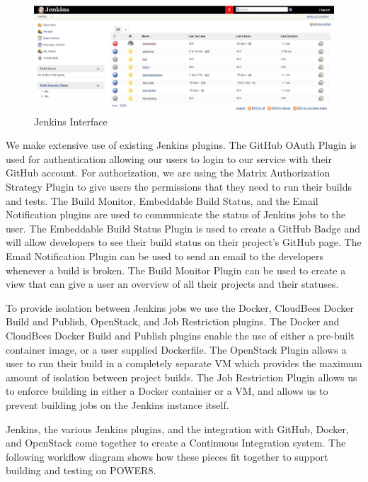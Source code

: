 \documentclass[10pt,onecolumn,journal,draftclsnofoot]{IEEEtran}
\begin{document}
\begin{figure}[H] 
  \includegraphics[width=\textwidth]{images/jenkins.eps}
  \caption{Jenkins Interface}
\end{figure}

We make extensive use of existing Jenkins plugins.
The GitHub OAuth Plugin is used for authentication allowing our users to login to our service with their GitHub account.
For authorization, we are using the Matrix Authorization Strategy Plugin to give users the permissions that they need to run their builds and tests.
The Build Monitor, Embeddable Build Status, and the Email Notification plugins are used to communicate the status of Jenkins jobs to the user.
The Embeddable Build Status Plugin is used to create a GitHub Badge and will allow developers to see their build status on their project's GitHub page.
The Email Notification Plugin can be used to send an email to the developers whenever a build is broken.
The Build Monitor Plugin can be used to create a view that can give a user an overview of all their projects and their statuses.

To provide isolation between Jenkins jobs we use the Docker, CloudBees Docker Build and Publish, OpenStack, and Job Restriction plugins. 
The Docker and CloudBees Docker Build and Publish plugins enable the use of either a pre-built container image, or a user supplied Dockerfile.
The OpenStack Plugin allows a user to run their build in a completely separate VM which provides the maximum amount of isolation between project builds. 
The Job Restriction Plugin allows us to enforce building in either a Docker container or a VM, and allows us to prevent building jobs on the Jenkins instance itself. 

Jenkins, the various Jenkins plugins, and the integration with GitHub, Docker, and OpenStack come together to create a Continuous Integration system.
The following workflow diagram shows how these pieces fit together to support building and testing on POWER8.
\end{document}
